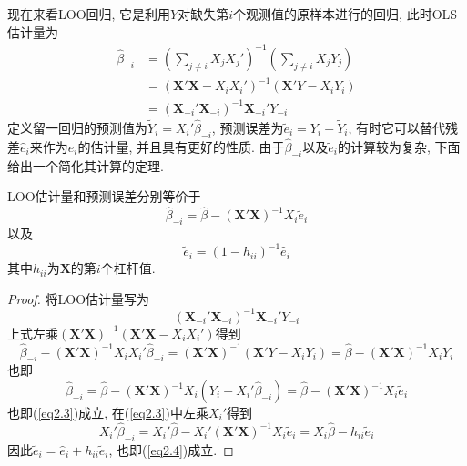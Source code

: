 \documentclass[cn, 12pt, math=mtpro2, bibstyle=apa, blue, twocol]{elegantbook}
\newcommand{\X}{\mathbold{X}}
\newcommand{\hb}{\hat{\beta}}
\begin{document}
现在来看LOO回归, 它是利用$Y$对缺失第$i$个观测值的原样本进行的回归, 此时OLS估计量为
\begin{align*}
\hat{\beta}_{-i}&=\left(\sum_{j\neq i}X_jX_j'\right)^{-1}\left(\sum_{j\neq i}X_jY_j\right) \\
&=(\X'\X-X_iX_i')^{-1}(\X'Y-X_iY_i) \\
&=(\X_{-i}'\X_{-i})^{-1}\X_{-i}'Y_{-i}
\end{align*}
定义留一回归的预测值为$\tilde{Y}_i=X_i'\hat{\beta}_{-i}$, 预测误差为$\tilde{e}_i=Y_i-\tilde{Y}_i$, 有时它可以替代残差$\hat{e}_i$来作为$e_i$的估计量, 并且具有更好的性质. 由于$\hat{\beta}_{-i}$以及$\tilde{e}_i$的计算较为复杂, 下面给出一个简化其计算的定理.
\begin{theorem}
  LOO估计量和预测误差分别等价于
  \begin{equation}\label{eq2.3}
    \hat{\beta}_{-i}=\hb-(\X'\X)^{-1}X_i\tilde{e}_i
  \end{equation}
  以及
  \begin{equation}\label{eq2.4}
    \tilde{e}_i=(1-h_{ii})^{-1}\hat{e}_i
  \end{equation}
  其中$h_{ii}$为$\X$的第$i$个杠杆值.
\end{theorem}
\begin{proof}
  将LOO估计量写为
  $$(\X_{-i}'\X_{-i})^{-1}\X_{-i}'Y_{-i}$$
  上式左乘$(\X'\X)^{-1}(\X'\X-X_iX_i')$得到
  $$\hb_{-i}-(\X'\X)^{-1}X_iX_i'\hb_{-i}=(\X'\X)^{-1}(\X'Y-X_iY_i)=\hb-(\X'\X)^{-1}X_iY_i$$
  也即
  $$\hb_{-i}=\hb-(\X'\X)^{-1}X_i(Y_i-X_i'\hb_{-i})=\hb-(\X'\X)^{-1}X_i\tilde{e}_i$$
  也即(\ref{eq2.3})成立, 在(\ref{eq2.3})中左乘$X_i'$得到
  $$X_i'\hb_{-i}=X_i'\hb-X_i'(\X'\X)^{-1}X_i\tilde{e}_i=X_i\hb-h_{ii}\tilde{e}_i$$
  因此$\tilde{e}_i=\hat{e}_i+h_{ii}\tilde{e}_i$, 也即(\ref{eq2.4})成立.
\end{proof}
\end{document}
